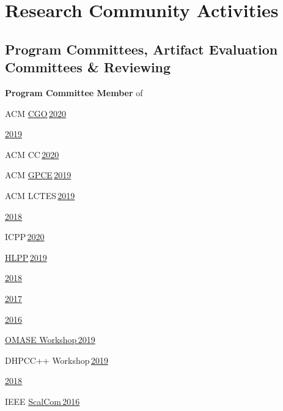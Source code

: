 \documentclass[11pt,a4paper]{moderncv}
\newcommand{\strong}[1]{\textcolor{color1}{\textbf{#1}}}
\newcommand{\highlight}[1]{\textcolor{color1}{#1}}
\begin{document}
\section{Research Community Activities}
\subsection{Program Committees, Artifact Evaluation Committees \& Reviewing}
  \begin{cvitemize}
  \item \strong{Program Committee Member} of
    \begin{inlineItemize}
      \item \highlight{ACM \href{http://cgo.org}{CGO}\,\href{http://cgo.org/}{2020}}
      \item \highlight{\href{http://cgo.org/cgo2019/}{2019}}
      \item \highlight{ACM CC\,\href{https://cc-conference.github.io/20/}{2020}}
      \item \highlight{ACM \href{https://conf.researchr.org/series/gpce}{GPCE}\,\href{https://conf.researchr.org/home/gpce-2019}{2019}}
      \item \highlight{ACM LCTES\,\href{https://conf.researchr.org/home/LCTES-2019}{2019}}
      \item \highlight{\href{https://conf.researchr.org/track/LCTES-2018/LCTES-2018-papers}{2018}}
      \item \highlight{ICPP\,\href{https://jnamaral.github.io/icpp20/}{2020}}
      \item \highlight{\href{http://hlpp.free.fr/}{HLPP}\,\href{https://www.ida.liu.se/conferences/hlpp2019/}{2019}}
      \item \highlight{\href{https://www.univ-orleans.fr/lifo/equipes/LMV/hlpp2018/index.php}{2018}}
      \item \highlight{\href{https://hlpp2017.infor.uva.es/}{2017}}
      \item \highlight{\href{http://hlpp2016.uni-muenster.de/}{2016}}
      \item \highlight{\href{https://omasew.github.io/}{OMASE Workshop\,2019}}
      \item \highlight{DHPCC++ Workshop\,\href{http://sycl.tech/distributed-heterogeneous-programming-in-c-cpp-dhpccpp19.html}{2019}}
      \item \highlight{\href{http://www.iwocl.org/iwocl-2018/dhpcc/}{2018}}
      \item \highlight{IEEE \href{https://scalcom2016.sciencesconf.org/}{ScalCom\,2016}}
    \end{inlineItemize}
\end{cvitemize}
\end{document}
